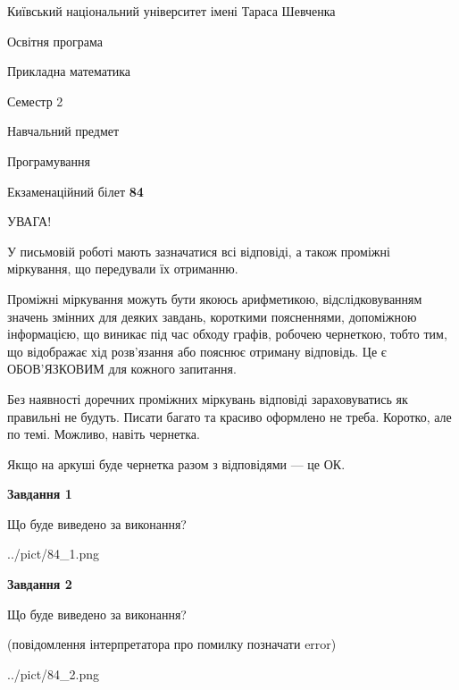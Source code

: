 \documentclass[12pt, ukrainian]{article}
\begin{document}
{{\begin {small}\par
{ \center  Київський національний університет імені Тараса Шевченка \par}
{\parbox {5 cm}{Освітня програма \hfill}{\parbox {7 cm}{Прикладна математика\hfill}}\parbox {6 cm}{\hfill Семестр 2}}\par
{\parbox {5 cm} {Навчальний предмет \hfill}\parbox {7 cm}{Програмування \hfill}\parbox {6cm}{\hfill}\par}\vspace{-7pt} \end{small}}{\center Екзаменаційний білет \No \textbf
{ 84 }\par}}
{
\begin {large}
УВАГА!

У письмовій роботі мають зазначатися всі відповіді, а також проміжні міркування, що передували їх отриманню.

Проміжні міркування можуть бути якоюсь арифметикою, відслідковуванням зна\-чень змінних для деяких завдань,
короткими поясненнями, допоміжною інформацією, що виникає під час обходу графів, робочею чернеткою,
тобто тим, що відображає хід розв’язання або пояснює отриману відповідь.
Це є ОБОВ’ЯЗКОВИМ для кожного запитання.

Без наявності доречних проміжних міркувань відповіді зараховуватись як правиль\-ні не будуть.
Писати багато та красиво оформлено не треба. Коротко, але по темі. Можли\-во, навіть чернетка.

Якщо на аркуші буде чернетка разом з відповідями --- це ОК.

\newpage

{\begin {center}\textbf{Завдання 1}\end {center}}\par
Що буде виведено за виконання?\par
\begin{center}
	{../pict/84_1.png}
\end{center}
\newpage

{\begin {center}\textbf{Завдання 2}\end {center}}\par
Що буде виведено за виконання?\par
 (повідомлення інтерпретатора про помилку позначати error)\par
\begin{center}
	{../pict/84_2.png}
\end{center}
\newpage


\end{large}}
\end{document}
